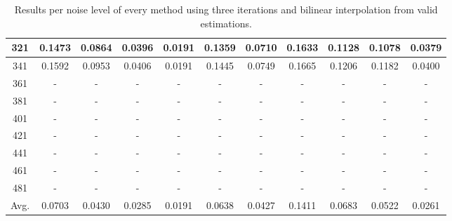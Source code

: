 \begin{table}[ht!]
\begin{tabular}{c|c|c|c|c|c|c|c|c|c|c}
321 & 0.1473 & 0.0864 & 0.0396 & 0.0191 & 0.1359 & 0.0710 & 0.1633 & 0.1128 & 0.1078 & 0.0379 \\ \hline
341 & 0.1592 & 0.0953 & 0.0406 & 0.0191 & 0.1445 & 0.0749 & 0.1665 & 0.1206 & 0.1182 & 0.0400 \\ \hline
361 & - & - & - & - & - & - & - & - & - & - \\ \hline
381 & - & - & - & - & - & - & - & - & - & - \\ \hline
401 & - & - & - & - & - & - & - & - & - & - \\ \hline
421 & - & - & - & - & - & - & - & - & - & - \\ \hline
441 & - & - & - & - & - & - & - & - & - & - \\ \hline
461 & - & - & - & - & - & - & - & - & - & - \\ \hline
481 & - & - & - & - & - & - & - & - & - & - \\ \hline
Avg.  & 0.0703 & 0.0430 & 0.0285 & 0.0191 & 0.0638 & 0.0427 & 0.1411 & 0.0683 & 0.0522 & 0.0261 \\ \hline
\end{tabular}
\caption{Results per noise level of every method using three iterations and bilinear interpolation from valid estimations.}
\label{tab:3itLperNoiseValid}
\end{table}


